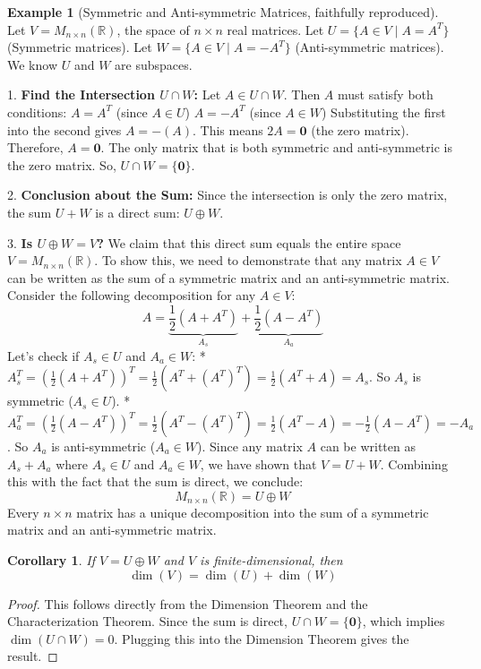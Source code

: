 \documentclass[11pt]{article}
\theoremstyle{plain}
\newtheorem{corollary}[theorem]{Corollary}
\theoremstyle{definition}
\newtheorem{example}[theorem]{Example}
\theoremstyle{remark}
\DeclareMathOperator{\dimv}{dim} %
\newcommand{\R}{\mathbb{R}}
\newcommand{\mat}[1]{\mathbf{#1}} %
\newcommand{\veczero}{\mathbf{0}} %
\begin{document}
\begin{example}[Symmetric and Anti-symmetric Matrices, faithfully reproduced]
Let $V = M_{n \times n}(\R)$, the space of $n \times n$ real matrices.
Let $U = \{ A \in V \mid A = A^T \}$ (Symmetric matrices).
Let $W = \{ A \in V \mid A = -A^T \}$ (Anti-symmetric matrices).
We know $U$ and $W$ are subspaces.

1.  \textbf{Find the Intersection $U \cap W$:}
    Let $A \in U \cap W$. Then $A$ must satisfy both conditions:
    $A = A^T$ (since $A \in U$)
    $A = -A^T$ (since $A \in W$)
    Substituting the first into the second gives $A = -(A)$. This means $2A = \mat{0}$ (the zero matrix).
    Therefore, $A = \mat{0}$.
    The only matrix that is both symmetric and anti-symmetric is the zero matrix.
    So, $U \cap W = \{\mat{0}\}$.

2.  \textbf{Conclusion about the Sum:}
    Since the intersection is only the zero matrix, the sum $U+W$ is a direct sum: $U \oplus W$.

3.  \textbf{Is $U \oplus W = V$?}
    We claim that this direct sum equals the entire space $V = M_{n \times n}(\R)$. To show this, we need to demonstrate that any matrix $A \in V$ can be written as the sum of a symmetric matrix and an anti-symmetric matrix. Consider the following decomposition for any $A \in V$:
    \[ A = \underbrace{\frac{1}{2}(A + A^T)}_{A_s} + \underbrace{\frac{1}{2}(A - A^T)}_{A_a} \]
    Let's check if $A_s \in U$ and $A_a \in W$:
    *   $A_s^T = \left(\frac{1}{2}(A + A^T)\right)^T = \frac{1}{2}(A^T + (A^T)^T) = \frac{1}{2}(A^T + A) = A_s$. So $A_s$ is symmetric ($A_s \in U$).
    *   $A_a^T = \left(\frac{1}{2}(A - A^T)\right)^T = \frac{1}{2}(A^T - (A^T)^T) = \frac{1}{2}(A^T - A) = -\frac{1}{2}(A - A^T) = -A_a$. So $A_a$ is anti-symmetric ($A_a \in W$).
    Since any matrix $A$ can be written as $A_s + A_a$ where $A_s \in U$ and $A_a \in W$, we have shown that $V = U+W$.
    Combining this with the fact that the sum is direct, we conclude:
    \[ M_{n \times n}(\R) = U \oplus W \]
    Every $n \times n$ matrix has a unique decomposition into the sum of a symmetric matrix and an anti-symmetric matrix.
\end{example}

\begin{corollary}
If $V = U \oplus W$ and $V$ is finite-dimensional, then
\[ \dimv(V) = \dimv(U) + \dimv(W) \]
\end{corollary}
\begin{proof}
This follows directly from the Dimension Theorem and the Characterization Theorem. Since the sum is direct, $U \cap W = \{\veczero\}$, which implies $\dimv(U \cap W) = 0$. Plugging this into the Dimension Theorem gives the result.
\end{proof}
\end{document}
